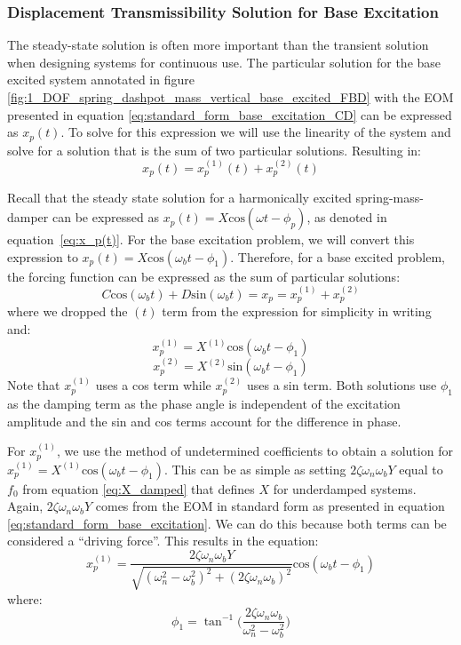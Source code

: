 \documentclass[12pt,letter]{article}
\begin{document}
	\subsubsection{Displacement Transmissibility Solution for Base Excitation}
		The steady-state solution is often more important than the transient solution when designing systems for continuous use. The particular solution for the base excited system annotated in figure \ref{fig:1_DOF_spring_dashpot_mass_vertical_base_excited_FBD} with the EOM presented in equation \ref{eq:standard_form_base_excitation_CD} can be expressed as $	x_p(t)$. To solve for this expression we will use the linearity of the system and solve for a solution that is the sum of two particular solutions. Resulting in:
		\begin{equation}
 x_p(t) = 	x_p^{(1)}(t) + 	x_p^{(2)}(t)  
		\end{equation}
		
 Recall that the steady state solution for a harmonically excited spring-mass-damper can be expressed as $x_p(t) = X\text{cos}(\omega t - \phi_p)$, as denoted in equation~\ref{eq:x_p(t)}. For the base excitation problem, we will convert this expression to $x_p(t) = X\text{cos}(\omega_b t - \phi_1)$. Therefore, for a base excited problem, the forcing function can be expressed as the sum of particular solutions:
		\begin{equation}
			C \text{cos}(\omega_b t)  + D \text{sin}(\omega_b t)   = x_p = 	x_p^{(1)} + 	x_p^{(2)} 
		\end{equation}
		where we dropped the $(t)$ term from the expression for simplicity in writing and:
		\begin{equation}
			x_p^{(1)} = X^{(1)}\text{cos}(\omega_b t - \phi_1)
		\end{equation}
		\begin{equation}
			x_p^{(2)} = X^{(2)} \text{sin}(\omega_b t - \phi_1)
		\end{equation}
		Note that $x_p^{(1)}$ uses a cos term while $x_p^{(2)}$ uses a sin term. Both solutions use $\phi_1$ as the damping term as the phase angle is independent of the excitation amplitude and the sin and cos terms account for the difference in phase. 
		
		For $x_p^{(1)}$, we use the method of undetermined coefficients to obtain a solution for $x_p^{(1)} = X^{(1)}\text{cos}(\omega_b t - \phi_1)$. This can be as simple as setting $2 \zeta \omega_n \omega_b Y$ equal to $f_0$ from equation \ref{eq:X_damped} that defines $X$ for underdamped systems. Again, $2 \zeta \omega_n \omega_b Y$  comes from the EOM in standard form as presented in equation 	
		\ref{eq:standard_form_base_excitation}. We can do this because both terms can be considered a ``driving force''. This results in the equation:
		\begin{equation}
			x_p^{(1)} = \frac{2 \zeta \omega_n \omega_b Y}{\sqrt{(\omega_n^2 - \omega_b^2)^2 +  (2\zeta \omega_n \omega_b)^2}}  \text{cos}(\omega_b t - \phi_1)
			\label{eq:xp_1}
		\end{equation}
		where:
		\begin{equation}
			\phi_1 = \tan^{-1} \bigg(\frac{2\zeta \omega_n \omega_b}{\omega_n^2 - \omega_b^2}\bigg)
		\end{equation}
		
\end{document}
